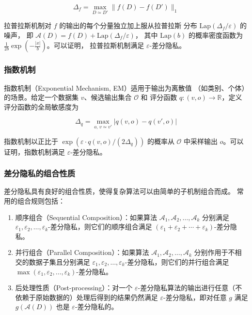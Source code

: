 \begin{equation}
    \label{equ:lm-sens}
    \Delta_f = \max_{D \simeq D'} \| f(D) - f(D') \|_1
\end{equation}

\par 拉普拉斯机制对 $f$ 的输出的每个分量独立加上服从拉普拉斯
分布 $\mathrm{Lap}(\Delta_f / \varepsilon)$ 的噪声，
即 $\mathcal{A}(D) = f(D) + \mathrm{Lap}(\Delta_f / \varepsilon)$，
其中 $\mathrm{Lap}(b)$ 的概率密度函数为 $\frac{1}{2b}\exp\!\left(-\frac{|x|}{b}\right)$。可以证明，
拉普拉斯机制满足 $\varepsilon$-差分隐私。

\subsubsection{指数机制}

\par 指数机制（Exponential Mechanism, EM）适用于输出为离散值
（如类别、个体）的场景。给定一个数据集 $v$、候选输出集合 $\mathcal{O}$ 和
评分函数 $q : (v, o) \to \mathbb{R}$，定义评分函数的全局敏感度为

\begin{equation}
    \label{equ:em-sens}
    \Delta_q = \max_{o,\, v \simeq v'} | q(v, o) - q(v', o) |
\end{equation}

\par 指数机制以正比于 $\exp\left( \varepsilon \cdot q(v, o) / (2 \Delta_q) \right)$ 
的概率从 $\mathcal{O}$ 中采样输出 $o$。可以证明，指数机制满足 $\varepsilon$-差分隐私。

\subsubsection{差分隐私的组合性质}

\par 差分隐私具有良好的组合性质，使得复杂算法可以由简单的子机制组合而成。
常用的组合规则包括：

\begin{enumerate}
    \item 顺序组合（Sequential Composition）：如果算法 $\mathcal{A}_1, \mathcal{A}_2, \ldots, \mathcal{A}_k$ 分别满足 $\varepsilon_1, \varepsilon_2, \ldots, \varepsilon_k$-差分隐私，则它们的顺序组合满足 $(\varepsilon_1 + \varepsilon_2 + \cdots + \varepsilon_k)$-差分隐私。
    
    \item 并行组合（Parallel Composition）：如果算法 $\mathcal{A}_1, \mathcal{A}_2, \ldots, \mathcal{A}_k$ 分别作用于不相交的数据子集且分别满足 $\varepsilon_1, \varepsilon_2, \ldots, \varepsilon_k$-差分隐私，则它们的并行组合满足 $\max(\varepsilon_1, \varepsilon_2, \ldots, \varepsilon_k)$-差分隐私。
    
    \item 后处理性质（Post-processing）：对一个 $\varepsilon$-差分隐私算法的输出进行任意（不依赖于原始数据的）处理后得到的结果仍然满足 $\varepsilon$-差分隐私，即对任意 $g$ 满足 $g(\mathcal{A}(D))$ 也是 $\varepsilon$-差分隐私的。
\end{enumerate}


